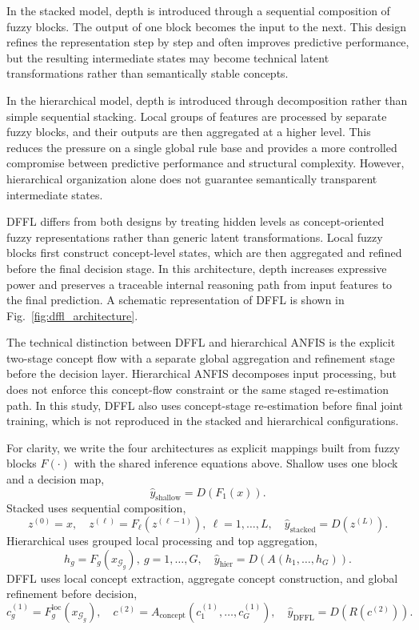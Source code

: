 \documentclass[runningheads]{llncs}
\begin{document}
In the stacked model, depth is introduced through a sequential composition of fuzzy blocks. The output of one block becomes the input to the next. This design refines the representation step by step and often improves predictive performance, but the resulting intermediate states may become technical latent transformations rather than semantically stable concepts.

In the hierarchical model, depth is introduced through decomposition rather than simple sequential stacking. Local groups of features are processed by separate fuzzy blocks, and their outputs are then aggregated at a higher level. This reduces the pressure on a single global rule base and provides a more controlled compromise between predictive performance and structural complexity. However, hierarchical organization alone does not guarantee semantically transparent intermediate states.

DFFL differs from both designs by treating hidden levels as concept-oriented fuzzy representations rather than generic latent transformations. Local fuzzy blocks first construct concept-level states, which are then aggregated and refined before the final decision stage. In this architecture, depth increases expressive power and preserves a traceable internal reasoning path from input features to the final prediction. A schematic representation of DFFL is shown in Fig.~\ref{fig:dffl_architecture}.

The technical distinction between DFFL and hierarchical ANFIS is the explicit two-stage concept flow with a separate global aggregation and refinement stage before the decision layer. Hierarchical ANFIS decomposes input processing, but does not enforce this concept-flow constraint or the same staged re-estimation path. In this study, DFFL also uses concept-stage re-estimation before final joint training, which is not reproduced in the stacked and hierarchical configurations.

For clarity, we write the four architectures as explicit mappings built from fuzzy blocks $F(\cdot)$ with the shared inference equations above. Shallow uses one block and a decision map,
\[
\hat{y}_{\mathrm{shallow}} = D\!\left(F_1(x)\right).
\]
Stacked uses sequential composition,
\[
z^{(0)}=x,\quad z^{(\ell)} = F_{\ell}\!\left(z^{(\ell-1)}\right),\ \ell=1,\dots,L,\quad
\hat{y}_{\mathrm{stacked}} = D\!\left(z^{(L)}\right).
\]
Hierarchical uses grouped local processing and top aggregation,
\[
h_g = F_g\!\left(x_{\mathcal{G}_g}\right),\ g=1,\dots,G,\quad
\hat{y}_{\mathrm{hier}} = D\!\left(A\!\left(h_1,\dots,h_G\right)\right).
\]
DFFL uses local concept extraction, aggregate concept construction, and global refinement before decision,
\[
c_g^{(1)} = F_g^{\mathrm{loc}}\!\left(x_{\mathcal{G}_g}\right),\quad
c^{(2)} = A_{\mathrm{concept}}\!\left(c_1^{(1)},\dots,c_G^{(1)}\right),\quad
\hat{y}_{\mathrm{DFFL}} = D\!\left(R\!\left(c^{(2)}\right)\right).
\]
\end{document}

